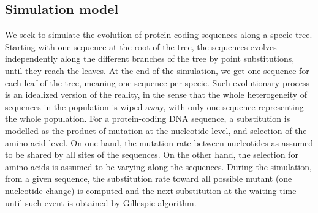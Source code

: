 \subsection{Simulation model}
\label{sec-mut-bias:simu}
We seek to simulate the evolution of protein-coding sequences along a specie tree.
Starting with one sequence at the root of the tree, the sequences evolves independently along the different branches of the tree by point substitutions, until they reach the leaves.
At the end of the simulation, we get one sequence for each leaf of the tree, meaning one sequence per specie.
Such evolutionary process is an idealized version of the reality, in the sense that the whole heterogeneity of sequences in the population is wiped away, with only one sequence representing the whole population.
For a protein-coding \acrshort{DNA} sequence, a substitution is modelled as the product of mutation at the nucleotide level, and selection of the amino-acid level.
On one hand, the mutation rate between nucleotides as assumed to be shared by all sites of the sequences.
On the other hand, the selection for amino acids is assumed to be varying along the sequences.
During the simulation, from a given sequence, the substitution rate toward all possible mutant (one nucleotide change) is computed and the next substitution at the waiting time until such event is obtained by Gillespie algorithm.

